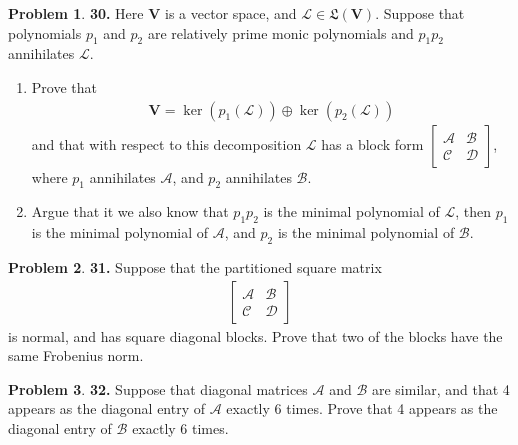 \documentclass{article}
\theoremstyle{definition}
\newtheorem*{prob*}{Problem}
\newcommand{\V}{\mathbf{V}}
\newcommand{\A}{\mathcal{A}}
\newcommand{\B}{\mathcal{B}}
\newcommand{\lag}{\mathcal{L}}
\newcommand{\LL}{\mathfrak{L}}
\begin{document}
\begin{prob*}\textbf{30.} Here $\V$ is a vector space, and $\lag \in \LL(\V)$. Suppose that polynomials $p_1$ and $p_2$ are relatively prime monic polynomials and $p_1p_2$ annihilates $\lag$. 
	
	\begin{enumerate}
		\item Prove that
		\begin{align*}
		\V = \ker(p_1(\lag)) \oplus \ker(p_2(\lag))
		\end{align*}
		and that with respect to this decomposition $\lag$ has a block form $\begin{bmatrix}
		\A & \B \\ \mathcal{C} & \mathcal{D}
		\end{bmatrix}$, where $p_1$ annihilates $\A$, and $p_2$ annihilates $\B$.
		
		
		\item Argue that it we also know that $p_1p_2$ is the minimal polynomial of $\lag$, then $p_1$ is the minimal polynomial of $\A$, and $p_2$ is the minimal polynomial of $\B$.
	\end{enumerate} 
	
\end{prob*}


\newpage














\begin{prob*}\textbf{31.} Suppose that the partitioned square matrix
	\begin{align*}
	\begin{bmatrix}
	\A & \B \\ \mathcal{C} & \mathcal{D}
	\end{bmatrix}
	\end{align*} 
	is normal, and has square diagonal blocks. Prove that two of the blocks have the same Frobenius norm.
	
\end{prob*}




\newpage




\begin{prob*}\textbf{32.} Suppose that diagonal matrices $\A$ and $\B$ are similar, and that 4 appears as the diagonal entry of $\A$ exactly 6 times. Prove that 4 appears as the diagonal entry of $\B$ exactly 6 times. 
	
\end{prob*}
\end{document}
